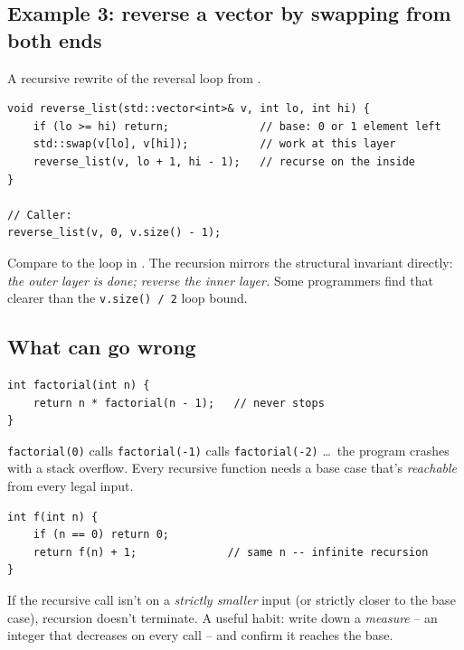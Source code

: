 \documentclass[11pt]{article}
\begin{document}
\subsection{Example 3: reverse a vector by swapping from both ends}

A recursive rewrite of the reversal loop from .

\begin{examplebox}
\begin{verbatim}
void reverse_list(std::vector<int>& v, int lo, int hi) {
    if (lo >= hi) return;              // base: 0 or 1 element left
    std::swap(v[lo], v[hi]);           // work at this layer
    reverse_list(v, lo + 1, hi - 1);   // recurse on the inside
}

// Caller:
reverse_list(v, 0, v.size() - 1);
\end{verbatim}
Compare to the loop in . The recursion mirrors the
structural invariant directly: \emph{the outer layer is done; reverse
the inner layer.} Some programmers find that clearer than the
\texttt{v.size() / 2} loop bound.
\end{examplebox}

\subsection{What can go wrong}

\begin{warnbox}
\begin{verbatim}
int factorial(int n) {
    return n * factorial(n - 1);   // never stops
}
\end{verbatim}
\texttt{factorial(0)} calls \texttt{factorial(-1)} calls
\texttt{factorial(-2)} \ldots\ the program crashes with a stack
overflow. Every recursive function needs a base case that's
\emph{reachable} from every legal input.
\end{warnbox}

\begin{warnbox}
\begin{verbatim}
int f(int n) {
    if (n == 0) return 0;
    return f(n) + 1;              // same n -- infinite recursion
}
\end{verbatim}
If the recursive call isn't on a \emph{strictly smaller} input (or
strictly closer to the base case), recursion doesn't terminate. A
useful habit: write down a \emph{measure} -- an integer that decreases
on every call -- and confirm it reaches the base.
\end{warnbox}
\end{document}
